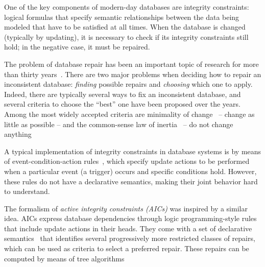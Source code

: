 One of the key components of modern-day databases are integrity constraints: logical formulas that specify semantic relationships between the data being modeled that have to be satisfied at all times.
When the database is changed (typically by updating), it is necessary to check if its integrity constraints still hold; in the negative case, it must be repaired.

The problem of database repair has been an important topic of research for more than thirty years~\cite{icdt/Abiteboul88}.
There are two major problems when deciding how to repair an inconsistent database: \emph{finding} possible repairs and \emph{choosing} which one to apply.
Indeed, there are typically several ways to fix an inconsistent database, and several criteria to choose the ``best'' one have been proposed over the years.
Among the most widely accepted criteria are minimality of change~\cite{Winslett90,ai/EiterG92} -- change as little as possible -- and the common-sense law of inertia~\cite[discussed in, e.g.,][]{PrzymusinskiT97} -- do not change anything 

A typical implementation of integrity constraints in database systems is by means of event-condition-action rules~\cite{TenienteO95,WidomC96}, which specify update actions to be performed when a particular event (a trigger) occurs and specific conditions hold.
However, these rules do not have a declarative semantics, making their joint behavior hard to understand.

The formalism of \emph{active integrity constraints (AICs)} \cite{ppdp/FlescaGZ04} was inspired by a similar idea.
AICs express database dependencies through logic programming-style rules that include update actions in their heads.
They come with a set of declarative semantics~\cite{tplp/CaropreseT11} that identifies several progressively more restricted classes of repairs, which can be used as criteria to select a preferred repair.
These repairs can be computed by means of tree algorithms

